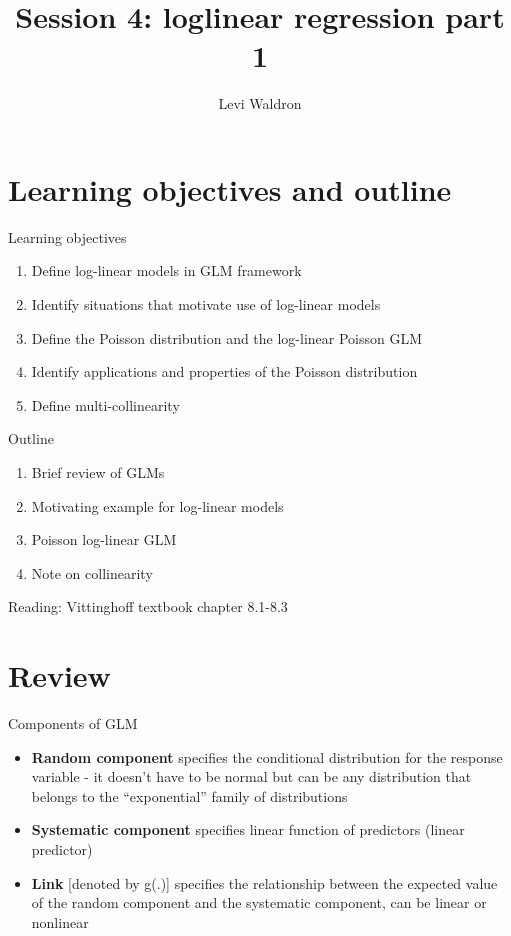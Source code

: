 \documentclass[ignorenonframetext,]{beamer}
\title{Session 4: loglinear regression part 1}
\author{Levi Waldron}
\institute{CUNY SPH Biostatistics 2}
\date{}
\providecommand{\tightlist}{%
  \setlength{\itemsep}{0pt}\setlength{\parskip}{0pt}}
\begin{document}
\frame{\titlepage}

\hypertarget{learning-objectives-and-outline}{%
\section{Learning objectives and
outline}\label{learning-objectives-and-outline}}

\begin{frame}{Learning objectives}
\protect\hypertarget{learning-objectives}{}

\begin{enumerate}
\tightlist
\item
  Define log-linear models in GLM framework
\item
  Identify situations that motivate use of log-linear models
\item
  Define the Poisson distribution and the log-linear Poisson GLM
\item
  Identify applications and properties of the Poisson distribution
\item
  Define multi-collinearity
\end{enumerate}

\end{frame}

\begin{frame}{Outline}
\protect\hypertarget{outline}{}

\begin{enumerate}
\tightlist
\item
  Brief review of GLMs
\item
  Motivating example for log-linear models
\item
  Poisson log-linear GLM
\item
  Note on collinearity
\end{enumerate}

Reading: Vittinghoff textbook chapter 8.1-8.3

\end{frame}

\hypertarget{review}{%
\section{Review}\label{review}}

\begin{frame}{Components of GLM}
\protect\hypertarget{components-of-glm}{}

\begin{itemize}
\tightlist
\item
  \textbf{Random component} specifies the conditional distribution for
  the response variable - it doesn't have to be normal but can be any
  distribution that belongs to the ``exponential'' family of
  distributions
\item
  \textbf{Systematic component} specifies linear function of predictors
  (linear predictor)
\item
  \textbf{Link} {[}denoted by g(.){]} specifies the relationship between
  the expected value of the random component and the systematic
  component, can be linear or nonlinear
\end{itemize}

\end{frame}
\end{document}
